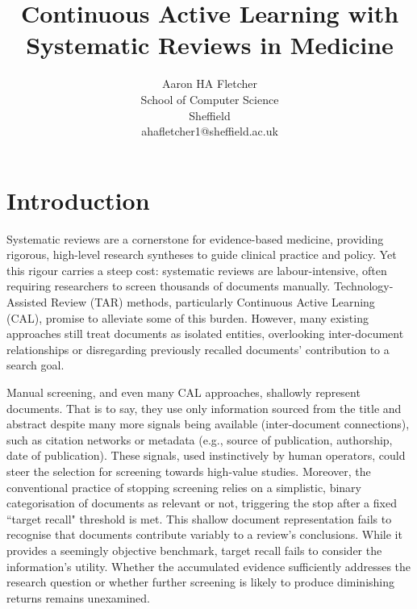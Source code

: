 \documentclass[10pt, english]{article}
\title{\textbf{Continuous Active Learning with Systematic Reviews in Medicine}}
\author{
    \fontsize{11}{13}\selectfont 
    Aaron HA Fletcher \\
    \fontsize{10}{11}\selectfont 
     School of Computer Science\\
    \fontsize{10}{11}\selectfont 
    Sheffield\\
    \fontsize{10}{11}\selectfont
    ahafletcher1@sheffield.ac.uk\\
}
\date{}
\begin{document}
\renewcommand{\abstractname}{} %
\maketitle %
\newpage



\newpage


\setlength{\absleftindent}{0em}

\begin{abstract}
    \abstractText %
\end{abstract}
\newpage
\tableofcontents
\newpage
\newcommand{\lightshadowbox}[1]{%
  \setlength{\fboxsep}{6pt}%
  \setlength{\shadowsize}{1pt}%
  \shadowbox{#1}%
}

\newpage
\section{Introduction}

Systematic reviews are a cornerstone for evidence-based medicine, providing rigorous, high-level research syntheses to guide clinical practice and policy. Yet this rigour carries a steep cost: systematic reviews are labour-intensive, often requiring researchers to screen thousands of documents manually. Technology-Assisted Review (TAR) methods, particularly Continuous Active Learning (CAL), promise to alleviate some of this burden. However, many existing approaches still treat documents as isolated entities, overlooking inter-document relationships or disregarding previously recalled documents' contribution to a search goal.

Manual screening, and even many CAL approaches, shallowly represent documents. That is to say, they use only information sourced from the title and abstract despite many more signals being available (inter-document connections), such as citation networks or metadata (e.g., source of publication, authorship, date of publication). These signals, used instinctively by human operators, could steer the selection for screening towards high-value studies. Moreover, the conventional practice of stopping screening relies on a simplistic, binary categorisation of documents as relevant or not, triggering the stop after a fixed ``target recall" threshold is met. This shallow document representation fails to recognise that documents contribute variably to a review's conclusions. While it provides a seemingly objective benchmark, target recall fails to consider the information's utility. Whether the accumulated evidence sufficiently addresses the research question or whether further screening is likely to produce diminishing returns remains unexamined. 
\end{document}
